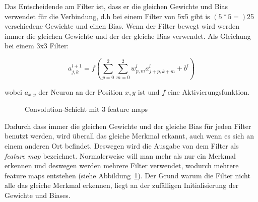 \documentclass[12pt,a4paper]{report}
\begin{document}
Das Entscheidende am Filter ist, dass er die gleichen Gewichte und Bias verwendet für die Verbindung, d.h bei einem
Filter von 5x5 gibt is $(5*5=)$25 verschiedene Gewichte und einen Bias.
Wenn der Filter bewegt wird werden immer die gleichen Gewichte und der der gleiche Bias verwendet.
Als Gleichung bei einem 3x3 Filter:

\[a^{l+1}_{j,k} = f\left(\sum_{p=0}^{2}\sum_{m=0}^{2}w^l_{p,m}a^l_{j+p,k+m} + b^l\right)\]

wobei $a_{x, y}$ der Neuron an der Position $x, y$ ist und $f$ eine Aktivierungsfunktion.

\begin{figure}[!h]%
    \centering
{}
    \caption{Convolution-Schicht mit 3 feature maps}%
    \label{fig:conv4}
\end{figure}

Dadurch dass immer die gleichen Gewichte und der gleiche Bias für jeden Filter benutzt werden,
wird überall das gleiche Merkmal erkannt, auch wenn es sich an einem anderen Ort befindet.
Deswegen wird die Ausgabe von dem Filter als \textit{feature map} bezeichnet.
Normalerweise will man mehr als nur ein Merkmal erkennen und deswegen werden mehrere Filter verwendet,
wodurch mehrere feature maps entstehen (siehe Abbildung~\ref{fig:conv4}).
Der Grund warum die Filter nicht alle das gleiche Merkmal erkennen, liegt an der zufälligen Initialisierung der Gewichte und Biases.
\end{document}
